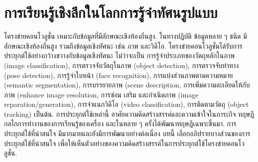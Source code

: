 \chapter{การเรียนรู้เชิงลึกในโลกการรู้จำทัศนรูปแบบ}
\label{chapter: Convolution Applications}

\begin{Parallel}[c]{0.52\textwidth}{0.42\textwidth}
\end{Parallel}


โครงข่ายคอนโวลูชั่น เหมาะกับข้อมูลที่มีลักษณะเชิงท้องถิ่นสูง.
ในทางปฎิบัติ ข้อมูลหลาย ๆ ชนิด มีลักษณะเชิงท้องถิ่นสูง รวมถึงข้อมูลเชิงทัศนะ เช่น ภาพ และวิดีโอ.
โครงข่ายคอนโวลูชั่นได้รับการประยุกต์ใช้อย่างกว้างขวางกับข้อมูลเชิงทัศนะ 
ไม่ว่าจะเป็น การรู้จำประเภทของวัตถุหลักในภาพ (image classification\cite{Alexnet2012, VGG2015, Inception2015, He_2016_CVPR, Densenet2017}),
การตรวจจับวัตถุในภาพ (object detection\cite{YOLO1, YOLO2, FasterRCNN2015}),
การตรวจจับท่าทาง (pose detection\cite{CaoEtAl2017}),
การรู้จำใบหน้า (face recognition\cite{SchroffEtAl2015}),
การแบ่งส่วนภาพตามความหมาย (semantic segmentation\cite{LongEtAl2015}),
การบรรยายภาพ (scene description\cite{KarpathyFeiFei2015, JohnsonEtAl2016, VinyalsEtAl2015},
การเพิ่มความละเอียดให้กับภาพ (enhance image resolution\cite{DongEtAl2014, ShiEtAl2016a, ShiEtAl2016},
การซ่อม เสริม และกำเนิดภาพ (image reparation/generation\cite{pixelRNN2016, VAE2019, GoodfellowEtAl2014a, PalssonEtAl2018}),
การจำแนกวิดีโอ (video classification\cite{KarpathyEtAl2014}),
การติดตามวัตถุ (object tracking\cite{WangEtAl2013b})
เป็นต้น.
การประยุกต์ใช้เหล่านี้ อาศัยความคิดสร้างสรรค์และความเข้าใจในภาระกิจ ทฤษฎี กลไกการทำงานของการเรียนรู้ของเครื่อง 
และในหลาย ๆ ครั้งได้พัฒนาทฤษฎีเฉพาะขึ้นมา.
การประยุกต์ใช้ที่น่าสนใจ มีมากมายและยังมีการพัฒนาอย่างต่อเนื่อง
บทนี้ เลือกอภิปรายบางส่วนของการประยุกต์ใช้ที่น่าสนใจ เพื่อให้เห็นตัวอย่างของความคิดสร้างสรรค์ในการประยุกต์ใช้โครงข่ายคอนโวลูชั่น.


